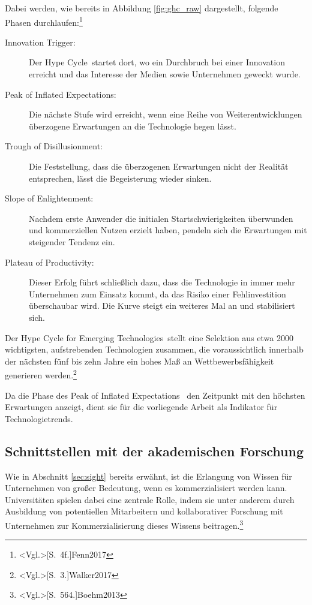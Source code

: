 Dabei werden, wie bereits in Abbildung \ref{fig:ghc_raw} dargestellt, folgende Phasen durchlaufen:\footnote{\citeNP<Vgl.>[S.~4f.]{Fenn2017}}
\begin{description}
	\item[Innovation Trigger:] Der \glqq Hype Cycle\grqq~startet dort, wo ein Durchbruch bei einer Innovation erreicht und das Interesse der Medien sowie Unternehmen geweckt wurde.
	\item[Peak of Inflated Expectations:] Die nächste Stufe wird erreicht, wenn eine Reihe von Weiterentwicklungen überzogene Erwartungen an die Technologie hegen lässt.
	\item[Trough of Disillusionment:] Die Feststellung, dass die überzogenen Erwartungen nicht der Realität entsprechen, lässt die Begeisterung wieder sinken.
	\item[Slope of Enlightenment:] Nachdem erste Anwender die initialen Startschwierigkeiten überwunden und kommerziellen Nutzen erzielt haben, pendeln sich die Erwartungen mit steigender Tendenz ein.
	\item[Plateau of Productivity:] Dieser Erfolg führt schließlich dazu, dass die Technologie in immer mehr Unternehmen zum Einsatz kommt, da das Risiko einer Fehlinvestition überschaubar wird. Die Kurve steigt ein weiteres Mal an und stabilisiert sich.
\end{description}

Der \glqq Hype Cycle for Emerging Technologies\grqq~stellt eine Selektion aus etwa 2000 wichtigsten, aufstrebenden Technologien zusammen, die voraussichtlich innerhalb der nächsten fünf bis zehn Jahre ein hohes Maß an Wettbewerbsfähigkeit generieren werden.\footnote{\citeNP<Vgl.>[S.~3.]{Walker2017}}

Da die Phase des \glqq Peak of Inflated Expectations\grqq~ den Zeitpunkt mit den höchsten Erwartungen anzeigt, dient sie für die vorliegende Arbeit als Indikator für Technologietrends.

\subsection{Schnittstellen mit der akademischen Forschung}
Wie in Abschnitt \ref{sec:sight} bereits erwähnt, ist die Erlangung von Wissen für Unternehmen von großer Bedeutung, wenn es kommerzialisiert werden kann. Universitäten spielen dabei eine zentrale Rolle, indem sie unter anderem durch Ausbildung von potentiellen Mitarbeitern und kollaborativer Forschung mit Unternehmen zur Kommerzialisierung dieses Wissens beitragen.\footnote{\citeNP<Vgl.>[S.~564.]{Boehm2013}}

